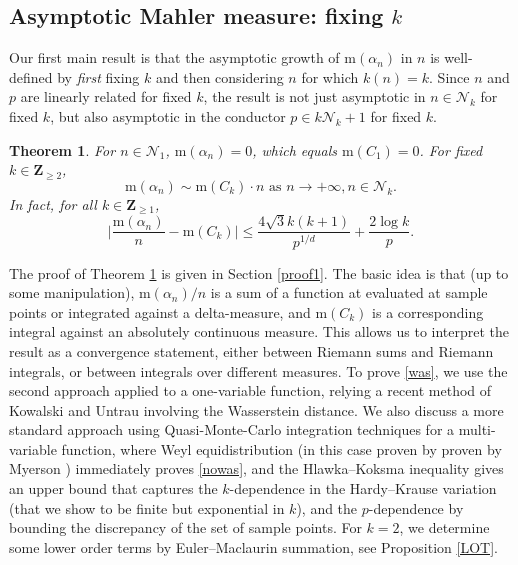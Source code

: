 \documentclass[12pt,reqno]{amsart}
\newtheorem{introtheorem}{Theorem}
\theoremstyle{definition}
\theoremstyle{plain}
\theoremstyle{definition}
\newcommand{\Z}{\mathbf{Z}}
\newcommand\m{\mathrm{m}}
\newcommand\NN{{\mathcal N}}
\renewcommand{\geq}{\geqslant}
\renewcommand{\leq}{\leqslant}
\begin{document}
\subsection*{Asymptotic Mahler measure: fixing $k$} 

Our first main result is that the asymptotic growth of $\m(\alpha_n)$ in $n$ is well-defined by \emph{first} fixing $k$ and then considering $n$ for which $k(n)=k$. Since $n$ and $p$ are linearly related for fixed $k$, the result is not just asymptotic in $n \in \NN_k$ for fixed $k$, but also asymptotic in the conductor $p \in k \NN_k+1$ for fixed $k$. 

\begin{introtheorem} \label{mainas} For $n \in \NN_1$, $\m(\alpha_n)=0$, which equals $\m(C_1)=0$. 
For fixed $k \in \Z_{\geq 2}$, 
\begin{equation} \label{nowas} \m(\alpha_n) \sim  \m(C_k) \cdot n \mbox{ as } n \rightarrow + \infty, n \in \NN_k.\end{equation}
 In fact, for all $k \in \Z_{\geq 1}$, 
\begin{equation} \label{was} \Big| \frac{\m(\alpha_n)}{n} - \m(C_k) \Big| \leq\frac{4\sqrt{3} k(k+1)}{p^{1/d}} + \frac{2\log k}{p}.    
\end{equation} 
 \end{introtheorem}

The proof of Theorem \ref{mainas} is given in Section \ref{proof1}. The basic idea is that (up to some manipulation), $\m(\alpha_n)/n$ is a sum of a function at evaluated at sample points or integrated against a delta-measure, and $\m(C_k)$ is a corresponding integral against an absolutely continuous measure. This allows us to interpret the result as a convergence statement, either between Riemann sums and Riemann integrals, or between integrals over different measures. To prove \eqref{was}, we use the second approach applied to a one-variable function, relying a recent method of Kowalski and Untrau \cite{KU} involving the Wasserstein distance. We also discuss a more standard approach using Quasi-Monte-Carlo integration techniques for a multi-variable function, where Weyl equidistribution (in this case proven by proven by Myerson \cite{Myerson}) immediately proves \eqref{nowas}, and  the Hlawka--Koksma inequality gives an upper bound that captures the $k$-dependence in the Hardy--Krause variation (that we show to be finite but exponential in $k$), and the $p$-dependence by bounding the discrepancy of the set of sample points.  For $k=2$, we determine some lower order terms by Euler--Maclaurin summation, see Proposition \ref{LOT}. 
\end{document}
